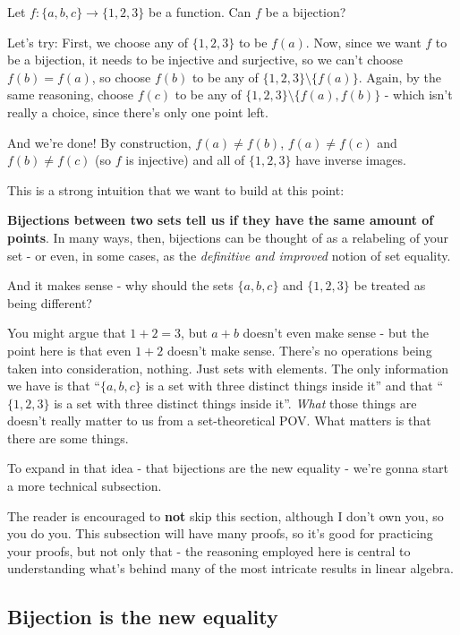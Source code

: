 \begin{ex}
	Let $f:\{a,b,c\}\to\{1,2,3\}$ be a function. Can $f$ be a bijection?
	
	Let's try: First, we choose any of $\{1,2,3\}$ to be $f(a)$. Now, since we want $f$ to be a bijection, it needs to be injective and surjective, so we can't choose $f(b)=f(a)$, so choose $f(b)$ to be any of $\{1,2,3\}\setminus \{f(a)\}$. Again, by the same reasoning, choose $f(c)$ to be any of $\{1,2,3\}\setminus\{f(a),f(b)\}$ - which isn't really a choice, since there's only one point left.
	
	And we're done! By construction, $f(a)\neq f(b)$, $f(a)\neq f(c)$ and $f(b)\neq f(c)$ (so $f$ is injective) and all of $\{1,2,3\}$ have inverse images.
	
	This is a strong intuition that we want to build at this point:
	
	\textbf{Bijections between two sets tell us if they have the same amount of points}. In many ways, then, bijections can be thought of as a relabeling of your set - or even, in some cases, as the \textit{definitive and improved} notion of set equality.
	
	And it makes sense - why should the sets $\{a,b,c\}$ and $\{1,2,3\}$ be treated as being different?
	
	You might argue that $1+2=3$, but $a+b$ doesn't even make sense - but the point here is that even $1+2$ doesn't make sense. There's no operations being taken into consideration, nothing. Just sets with elements. The only information we have is that ``$\{a,b,c\}$ is a set with three distinct things inside it'' and that ``$\{1,2,3\}$ is a set with three distinct things inside it''. \textit{What} those things are doesn't really matter to us from a set-theoretical POV. What matters is that there are some things. 
\end{ex}

To expand in that idea - that bijections are the new equality - we're gonna start a more technical subsection.

The reader is encouraged to \textbf{not} skip this section, although I don't own you, so you do you. This subsection will have many proofs, so it's good for practicing your proofs, but not only that - the reasoning employed here is central to understanding what's behind many of the most intricate results in linear algebra.
\newpage
\subsection{Bijection is the new equality}

